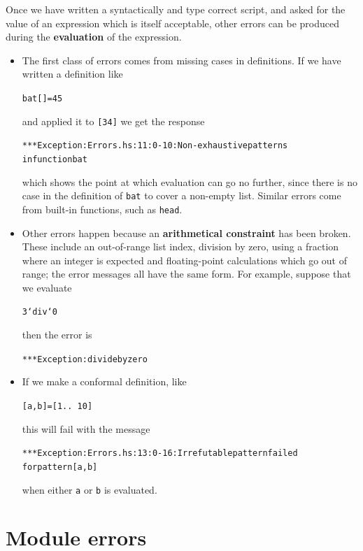 Once we have written a syntactically and type
correct script, and asked for the value of an
expression which is itself acceptable, other errors can be produced during
the \textbf{evaluation\/} of the expression.
\begin{itemize}
\item
The first class of errors comes from missing cases in definitions. If we
have written a definition like
\begin{alltt}
bat [] = 45
\end{alltt} 
and applied it to \texttt{[34]} we get the response
\begin{alltt}
*** Exception: Errors.hs:11:0-10: Non-exhaustive patterns 
               in function bat
\end{alltt}
which shows the point at which evaluation can go no further, since there is no
case in the definition of \texttt{bat} to cover a non-empty list. Similar errors
come from built-in functions, such as \texttt{head}.

\item
Other errors happen because an \textbf{arithmetical constraint\/} has been
broken. These include an out-of-range list index, division by zero, using a
fraction where an integer is expected and floating-point calculations which go
out of range; the error messages all have the same form. For example, suppose that we evaluate 
\begin{alltt}
3 `div` 0
\end{alltt}
then the error is
\begin{alltt} 
*** Exception: divide by zero
\end{alltt}

\item
If we make a conformal definition, like
\begin{alltt}
[a,b] = [1 ..\ 10]
\end{alltt}
this will fail with the message
\begin{alltt}
*** Exception: Errors.hs:13:0-16: Irrefutable pattern failed 
               for pattern [a, b]
\end{alltt}
\noindent
when either \texttt{a} or \texttt{b} is evaluated.

\end{itemize}
\vspace{-8pt}

\section*{Module errors}
\vspace{-5pt}

